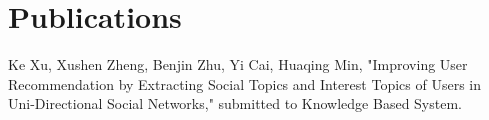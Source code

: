 \documentclass[]{deedy-resume-openfont}
\begin{document}
\begin{minipage}[t]{0.69\textwidth}

\section{Publications}
\sectionsep %

\begin{tightemize}
\item Ke Xu, Xushen Zheng, Benjin Zhu, Yi Cai, Huaqing Min, {"Improving User Recommendation by Extracting Social Topics and Interest Topics of Users in Uni-Directional Social Networks,"} submitted to Knowledge Based System.
\end{tightemize}





\end{minipage}
\end{document}
